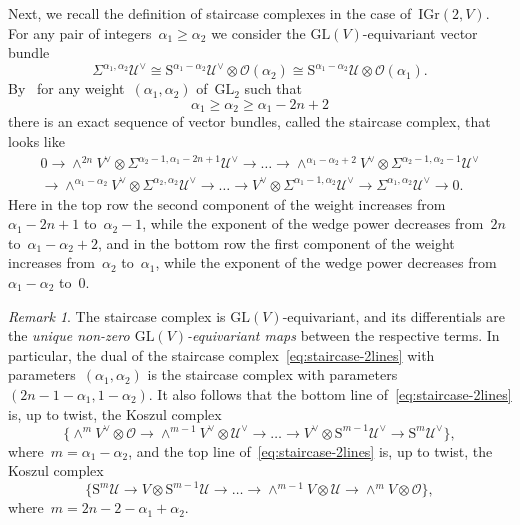 \documentclass[a4paper]{article}
\newcommand{\Gr}{\mathrm{Gr}}
\newcommand{\IGr}{\mathrm{IGr}}
\newcommand{\GL}{\mathrm{GL}}
\newcommand{\cU}{\mathcal{U}}
\newcommand{\Sy}{\mathrm{S}}
\newcommand{\cO}{\mathcal{O}}
\theoremstyle{remark}
\newtheorem{remark}[theorem]{Remark}
\theoremstyle{definition}
\begin{document}
Next, we recall the definition of staircase complexes in the case of~\(\IGr(2, V)\).
For any pair of integers~\(\alpha_1 \ge \alpha_2\) we consider the \(\GL(V)\)-equivariant vector bundle
\begin{equation}
\label{eq:sigma-s}
\Sigma^{\alpha_1,\alpha_2}\cU^\vee \cong \Sy^{\alpha_1-\alpha_2}\cU^\vee \otimes \cO(\alpha_2) \cong \Sy^{\alpha_1-\alpha_2}\cU \otimes \cO(\alpha_1).
\end{equation}
By~\cite{Fonarev_2013} for any weight~\((\alpha_1,\alpha_2)\) of~\(\GL_2\) such that
\begin{equation}
\label{eq:weight-gl2}
\alpha_1 \ge \alpha_2 \ge \alpha_1 - 2n + 2
\end{equation}
there is an exact sequence of vector bundles, called the {\sf staircase complex}, that looks like
\begin{multline}
\label{eq:staircase-2lines}
0 \to
\wedge^{2n}V^\vee \otimes \Sigma^{\alpha_2-1,\alpha_1-2n+1}\cU^\vee \to 
\dots \to
\wedge^{\alpha_1-\alpha_2+2}V^\vee \otimes \Sigma^{\alpha_2-1,\alpha_2-1}\cU^\vee 
\\ \to 
\wedge^{\alpha_1-\alpha_2}V^\vee \otimes \Sigma^{\alpha_2,\alpha_2}\cU^\vee \to 
\dots \to
V^\vee \otimes \Sigma^{\alpha_1-1,\alpha_2}\cU^\vee \to 
\Sigma^{\alpha_1,\alpha_2}\cU^\vee \to 
0.
\end{multline}
Here in the top row the second component of the weight increases from~\(\alpha_1 - 2n + 1\) to~\(\alpha_2-1\), 
while the exponent of the wedge power decreases from~\(2n\) to~\(\alpha_1 - \alpha_2 + 2\),
and in the bottom row the first component of the weight increases from~\(\alpha_2\) to~\(\alpha_1\), 
while the exponent of the wedge power decreases from~\(\alpha_1 - \alpha_2\) to~\(0\).

\begin{remark}
\label{rem:staircase-unique}
The staircase complex is \(\GL(V)\)-equivariant,
and its differentials are the \emph{unique non-zero \(\GL(V)\)-equivariant maps} between the respective terms.
In particular, the dual of the staircase complex~\eqref{eq:staircase-2lines} with parameters~\((\alpha_1,\alpha_2)\)
is the staircase complex with parameters~\((2n - 1 - \alpha_1, 1 - \alpha_2)\).
It also follows that the bottom line of~\eqref{eq:staircase-2lines} is, up to twist, the Koszul complex
\begin{equation}
\label{eq:koszul-right}
\Big\{ 
\wedge^mV^\vee \otimes \cO \to 
\wedge^{m-1}V^\vee \otimes \cU^\vee \to 
\dots \to 
V^\vee \otimes \Sy^{m-1}\cU^\vee \to 
\Sy^m\cU^\vee
\Big\},
\end{equation}
where~\(m = \alpha_1 - \alpha_2\),
and the top line of~\eqref{eq:staircase-2lines} is, up to twist, the Koszul complex
\begin{equation*}
\Big\{ 
\Sy^m\cU \to V \otimes \Sy^{m-1}\cU \to 
\dots \to 
\wedge^{m-1}V \otimes \cU \to 
\wedge^mV \otimes \cO
\Big\},
\end{equation*}
where~\(m = 2n - 2 - \alpha_1 + \alpha_2\).
\end{remark}
\end{document}
